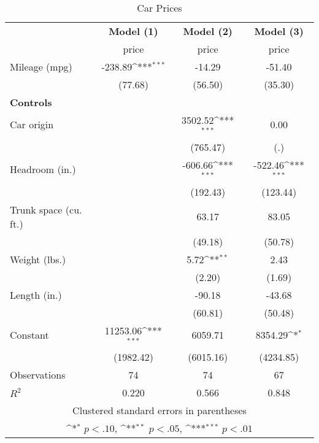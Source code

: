 \begin{table}[htbp]\centering
\def\sym#1{\ifmmode^{#1}\else\(^{#1}\)\fi}
\caption{Car Prices \label{reg_prices}}
\begin{tabular}{l*{3}{c}}
\toprule
                    &\multicolumn{1}{c}{\textbf{Model (1)}}&\multicolumn{1}{c}{\textbf{Model (2)}}&\multicolumn{1}{c}{\textbf{Model (3)}}\\
                    &       price         &       price         &       price         \\
\midrule
Mileage (mpg)       &     -238.89\sym{***}&      -14.29         &      -51.40         \\
                    &     (77.68)         &     (56.50)         &     (35.30)         \\
\textbf{Controls}   &                     &                     &                     \\
Car origin          &                     &     3502.52\sym{***}&        0.00         \\
                    &                     &    (765.47)         &         (.)         \\
Headroom (in.)      &                     &     -606.66\sym{***}&     -522.46\sym{***}\\
                    &                     &    (192.43)         &    (123.44)         \\
Trunk space (cu. ft.)&                     &       63.17         &       83.05         \\
                    &                     &     (49.18)         &     (50.78)         \\
Weight (lbs.)       &                     &        5.72\sym{**} &        2.43         \\
                    &                     &      (2.20)         &      (1.69)         \\
Length (in.)        &                     &      -90.18         &      -43.68         \\
                    &                     &     (60.81)         &     (50.48)         \\
Constant            &    11253.06\sym{***}&     6059.71         &     8354.29\sym{*}  \\
                    &   (1982.42)         &   (6015.16)         &   (4234.85)         \\
\midrule
Observations        &          74         &          74         &          67         \\
\(R^{2}\)           &       0.220         &       0.566         &       0.848         \\
\bottomrule
\multicolumn{4}{c}{\footnotesize Clustered standard errors in parentheses}\\
\multicolumn{4}{c}{\footnotesize \sym{*} \(p<.10\), \sym{**} \(p<.05\), \sym{***} \(p<.01\)}\\
\end{tabular}
\end{table}
